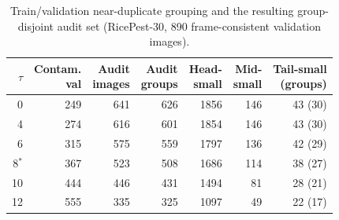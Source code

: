 \begin{table}[!htbp]
\small
\caption{Train/validation near-duplicate grouping and the resulting group-disjoint audit set (RicePest-30, 890 frame-consistent validation images).}
\label{tab:leakage}
\begin{tabular*}{\textwidth}{@{\extracolsep{\fill}}rrrrrrr}
\toprule
$\tau$ & \shortstack{Contam.\\val} & \shortstack{Audit\\images} & \shortstack{Audit\\groups} & \shortstack{Head-\\small} & \shortstack{Mid-\\small} & \shortstack{Tail-small\\(groups)} \\
\midrule
0 & 249 & 641 & 626 & 1856 & 146 & 43 (30) \\
4 & 274 & 616 & 601 & 1854 & 146 & 43 (30) \\
6 & 315 & 575 & 559 & 1797 & 136 & 42 (29) \\
8$^{\ast}$ & 367 & 523 & 508 & 1686 & 114 & 38 (27) \\
10 & 444 & 446 & 431 & 1494 & 81 & 28 (21) \\
12 & 555 & 335 & 325 & 1097 & 49 & 22 (17) \\
\bottomrule
\end{tabular*}
\end{table}
